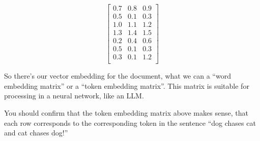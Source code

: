 \[
\begin{bmatrix}
    0.7 & 0.8 & 0.9 \\
    0.5 & 0.1 & 0.3 \\
    1.0 & 1.1 & 1.2 \\
    1.3 & 1.4 & 1.5 \\
    0.2 & 0.4 & 0.6 \\
    0.5 & 0.1 & 0.3 \\
    0.3 & 0.1 & 1.2 \\
\end{bmatrix}
\]

So there's our vector embedding for the document,  what we can a ``word embedding matrix'' or a ``token embedding matrix''. This matrix is suitable for processing in a neural network, like an LLM. 

You should confirm that the token embedding matrix above makes sense, that each row corresponds to the corresponding token in the sentence ``dog chases cat and cat chases dog!''